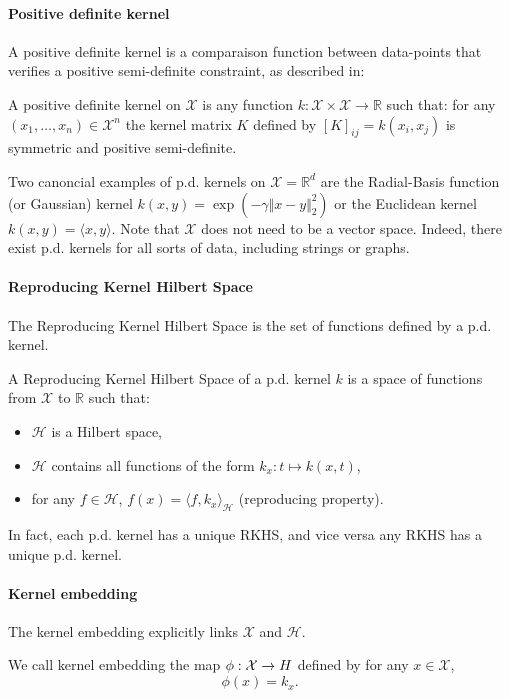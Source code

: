 \paragraph{Positive definite kernel} A positive definite kernel is a comparaison function between data-points that verifies a positive semi-definite constraint, as described in:
\begin{mdframed}
\begin{definition}
A positive definite kernel on $\mathcal X$ is any function $k: \mathcal X \times \mathcal X \to \mathbb R$ such that: for any $(x_1, \ldots, x_n)\in\mathcal X^n$ the kernel matrix $K$ defined by $[K]_{ij} = k(x_i, x_j)$ is symmetric and positive semi-definite.
\end{definition}
\end{mdframed}
Two canoncial examples of p.d. kernels on $\mathcal X = \mathbb R^d$ are the Radial-Basis function (or Gaussian) kernel $k(x, y) = \exp(-\gamma \Vert x - y \Vert_2^2)$ or the Euclidean kernel $k(x, y) = \langle x, y \rangle$. Note that $\mathcal X$ does not need to be a vector space. Indeed, there exist p.d. kernels for all sorts of data, including strings or graphs.

\paragraph{Reproducing Kernel Hilbert Space}
The Reproducing Kernel Hilbert Space is the set of functions defined by a p.d. kernel.
\begin{mdframed}
\begin{definition}
A Reproducing Kernel Hilbert Space of a p.d. kernel $k$ is a space of functions from $\mathcal X$ to $\mathbb R$ such that:
\begin{itemize}
\item $\mathcal H$ is a Hilbert space,
\item $\mathcal H$ contains all functions of the form $k_x: t\mapsto k(x, t)$,
\item for any $f\in\mathcal H$, $f(x) = \langle f, k_x\rangle_\mathcal H$ (reproducing property).
\end{itemize}
\end{definition}
\end{mdframed}
In fact, each p.d. kernel has a unique RKHS, and vice versa any RKHS has a unique p.d. kernel.\citep{aronszajn1950theory}

\paragraph{Kernel embedding}
The kernel embedding explicitly links $\mathcal X$ and $\mathcal H$.
\begin{mdframed}
\begin{definition}
We call kernel embedding the map $\phi: \mathcal X \to \mathbb \mathcal H$ defined by for any $x\in\mathcal X$,
$$ \phi(x) = k_x.$$
\end{definition}
\end{mdframed}


